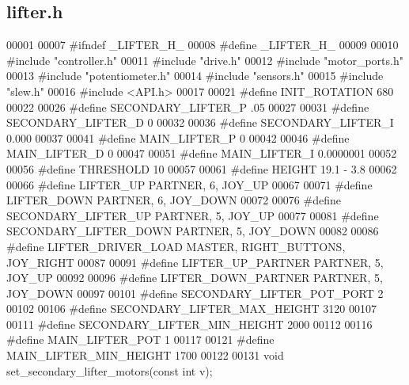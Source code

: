 \subsection{lifter.\+h}
\label{lifter_8h_source}

\begin{DoxyCode}
00001 
00007 \textcolor{preprocessor}{#ifndef \_LIFTER\_H\_}
00008 \textcolor{preprocessor}{#define \_LIFTER\_H\_}
00009 
00010 \textcolor{preprocessor}{#include "controller.h"}
00011 \textcolor{preprocessor}{#include "drive.h"}
00012 \textcolor{preprocessor}{#include "motor_ports.h"}
00013 \textcolor{preprocessor}{#include "potentiometer.h"}
00014 \textcolor{preprocessor}{#include "sensors.h"}
00015 \textcolor{preprocessor}{#include "slew.h"}
00016 \textcolor{preprocessor}{#include <API.h>}
00017 
00021 \textcolor{preprocessor}{#define INIT\_ROTATION 680}
00022 
00026 \textcolor{preprocessor}{#define SECONDARY\_LIFTER\_P .05}
00027 
00031 \textcolor{preprocessor}{#define SECONDARY\_LIFTER\_D 0}
00032 
00036 \textcolor{preprocessor}{#define SECONDARY\_LIFTER\_I 0.000}
00037 
00041 \textcolor{preprocessor}{#define MAIN\_LIFTER\_P 0}
00042 
00046 \textcolor{preprocessor}{#define MAIN\_LIFTER\_D 0}
00047 
00051 \textcolor{preprocessor}{#define MAIN\_LIFTER\_I 0.0000001}
00052 
00056 \textcolor{preprocessor}{#define THRESHOLD 10}
00057 
00061 \textcolor{preprocessor}{#define HEIGHT 19.1 - 3.8}
00062 
00066 \textcolor{preprocessor}{#define LIFTER\_UP PARTNER, 6, JOY\_UP}
00067 
00071 \textcolor{preprocessor}{#define LIFTER\_DOWN PARTNER, 6, JOY\_DOWN}
00072 
00076 \textcolor{preprocessor}{#define SECONDARY\_LIFTER\_UP PARTNER, 5, JOY\_UP}
00077 
00081 \textcolor{preprocessor}{#define SECONDARY\_LIFTER\_DOWN PARTNER, 5, JOY\_DOWN}
00082 
00086 \textcolor{preprocessor}{#define LIFTER\_DRIVER\_LOAD MASTER, RIGHT\_BUTTONS, JOY\_RIGHT}
00087 
00091 \textcolor{preprocessor}{#define LIFTER\_UP\_PARTNER PARTNER, 5, JOY\_UP}
00092 
00096 \textcolor{preprocessor}{#define LIFTER\_DOWN\_PARTNER PARTNER, 5, JOY\_DOWN}
00097 
00101 \textcolor{preprocessor}{#define SECONDARY\_LIFTER\_POT\_PORT 2}
00102 
00106 \textcolor{preprocessor}{#define SECONDARY\_LIFTER\_MAX\_HEIGHT 3120}
00107 
00111 \textcolor{preprocessor}{#define SECONDARY\_LIFTER\_MIN\_HEIGHT 2000}
00112 
00116 \textcolor{preprocessor}{#define MAIN\_LIFTER\_POT 1}
00117 
00121 \textcolor{preprocessor}{#define MAIN\_LIFTER\_MIN\_HEIGHT 1700}
00122 
00131 \textcolor{keywordtype}{void} set_secondary_lifter_motors(\textcolor{keyword}{const} \textcolor{keywordtype}{int} v);

\end{DoxyCode}
